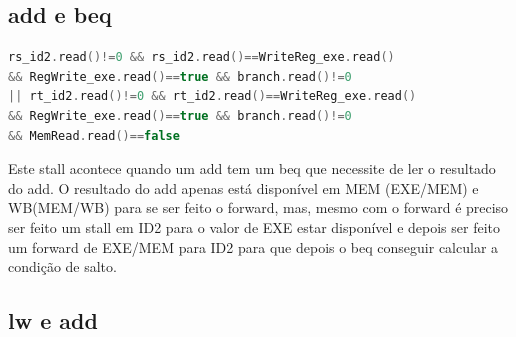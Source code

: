 \documentclass[pdftex,12pt,a4paper]{report}
\begin{document}
\newpage
\subsection{add e beq}
\begin{table}[!htb]
\centering
\label{my-label}
\end{table}


\begin{lstlisting}[language = c]
rs_id2.read()!=0 && rs_id2.read()==WriteReg_exe.read() 
&& RegWrite_exe.read()==true && branch.read()!=0
|| rt_id2.read()!=0 && rt_id2.read()==WriteReg_exe.read()
&& RegWrite_exe.read()==true && branch.read()!=0 
&& MemRead.read()==false
\end{lstlisting}

Este stall acontece quando um add tem um beq que necessite de ler o resultado do add. O resultado do add apenas está disponível em MEM (EXE/MEM) e WB(MEM/WB) para se ser feito o forward, mas, mesmo com o forward é preciso ser feito um stall em ID2 para o valor de EXE estar disponível e depois ser feito um forward de EXE/MEM para ID2 para que depois o beq conseguir calcular a condição de salto.

\subsection{lw e add}
\begin{table}[!htb]
\centering
\label{my-label}
\end{table}
\end{document}
